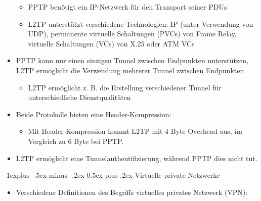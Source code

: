 \documentclass[a4paper]{article}
\makeatletter
\renewcommand{\subsection}{\@startsection{subsection}{2}{0mm}%
 {-1explus -.5ex minus -.2ex}%
 {0.5ex plus .2ex}%
 {\normalfont\normalsize\bfseries}}
\makeatother
\begin{document}
\begin{multicols}{3}
\begin{itemize}
              \begin{itemize}
                  \item
                        PPTP benötigt ein IP-Netzwerk für den Transport seiner PDUs
                  \item
                        L2TP unterstützt verschiedene Technologien: IP (unter Verwendung von
                        UDP), permanente virtuelle Schaltungen (PVCs) von Frame Relay,
                        virtuelle Schaltungen (VCs) von X.25 oder ATM VCs
              \end{itemize}
        \item
              PPTP kann nur einen einzigen Tunnel zwischen Endpunkten unterstützen,
              L2TP ermöglicht die Verwendung mehrerer Tunnel zwischen Endpunkten

              \begin{itemize}
                  \item
                        L2TP ermöglicht z. B. die Erstellung verschiedener Tunnel für
                        unterschiedliche Dienstqualitäten
              \end{itemize}
        \item
              Beide Protokolle bieten eine Header-Kompression:

              \begin{itemize}
                  \item
                        Mit Header-Kompression kommt L2TP mit 4 Byte Overhead aus, im
                        Vergleich zu 6 Byte bei PPTP.
              \end{itemize}
        \item
              L2TP ermöglicht eine Tunnelauthentifizierung, während PPTP dies nicht
              tut.
    \end{itemize}


    \subsection{Virtuelle private
        Netzwerke}

    \begin{itemize}
        \item
              Verschiedene Definitionen des Begriffs virtuelles privates Netzwerk
              (VPN):


\end{itemize}
\end{multicols}
\end{document}
